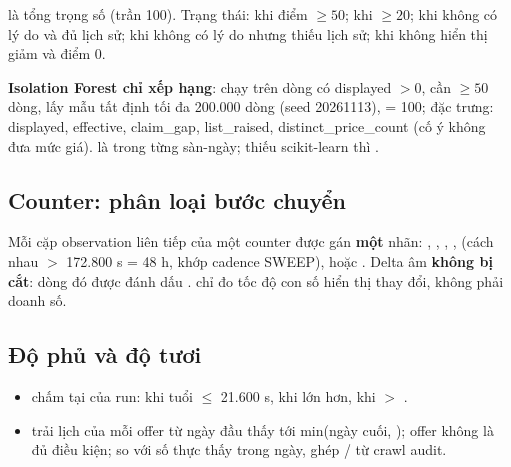  là tổng trọng số (trần 100). Trạng thái:  khi điểm $\ge 50$;  khi $\ge 20$;
 khi không có lý do và đủ lịch sử;  khi không có lý do nhưng thiếu lịch sử;
 khi không hiển thị giảm và điểm 0.

\textbf{Isolation Forest chỉ xếp hạng}: chạy trên dòng có displayed $> 0$, cần $\ge 50$ dòng, lấy mẫu tất định tối đa 200.000 dòng
(seed 20261113),  = 100; đặc trưng: displayed, effective, claim\_gap, list\_raised, distinct\_price\_count (cố ý không đưa mức giá).
 là  trong từng sàn-ngày; thiếu scikit-learn thì .

\subsection{Counter: phân loại bước chuyển}\label{sec:counter-rules}
Mỗi cặp observation liên tiếp của một counter được gán \textbf{một} nhãn: , ,
, ,  (cách nhau $>$ 172.800 s = 48 h, khớp cadence SWEEP),
 hoặc . Delta âm \textbf{không bị cắt}: dòng đó được đánh dấu .
 chỉ đo tốc độ con số hiển thị thay đổi, không phải doanh số.

\subsection{Độ phủ và độ tươi}
\begin{itemize}
  \item {} chấm tại  của run:  khi tuổi $\le$ 21.600 s,  khi lớn hơn,  khi  $>$ .
  \item {} trải lịch của mỗi offer từ ngày đầu thấy tới min(ngày cuối, ); offer không  là đủ điều kiện; so với số thực thấy trong ngày, ghép / từ crawl audit.
\end{itemize}
